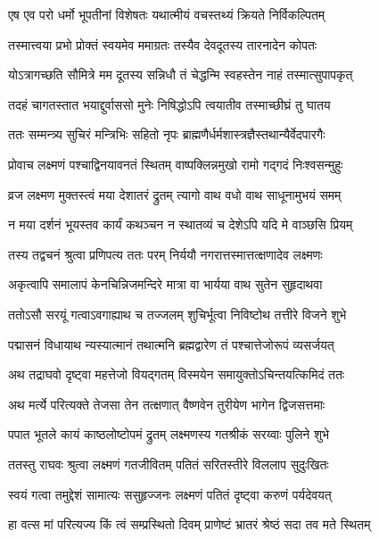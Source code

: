 \twolineshloka
{एष एव परो धर्मो भूपतीनां विशेषतः}
{यथात्मीयं वचस्तथ्यं क्रियते निर्विकल्पितम्}%

\twolineshloka
{तस्मात्त्वया प्रभो प्रोक्तं स्वयमेव ममाग्रतः}
{तस्यैव देवदूतस्य तारनादेन कोपतः}%

\twolineshloka
{योऽत्रागच्छति सौमित्रे मम दूतस्य सन्निधौ}
{तं चेद्धन्मि स्वहस्तेन नाहं तस्मात्सुपापकृत्}%

\twolineshloka
{तदहं चागतस्तात भयाद्दुर्वाससो मुनेः}
{निषिद्धोऽपि त्वयातीव तस्माच्छीघ्रं तु घातय}%

\twolineshloka
{ततः सम्मन्त्र्य सुचिरं मन्त्रिभिः सहितो नृपः}
{ब्राह्मणैर्धर्मशास्त्रज्ञैस्तथान्यैर्वेदपारगैः}%

\twolineshloka
{प्रोवाच लक्ष्मणं पश्चाद्विनयावनतं स्थितम्}
{वाष्पक्लिन्नमुखो रामो गद्गदं निःश्वसन्मुहुः}%

\twolineshloka
{व्रज लक्ष्मण मुक्तस्त्वं मया देशातरं द्रुतम्}
{त्यागो वाथ वधो वाथ साधूनामुभयं समम्}%

\twolineshloka
{न मया दर्शनं भूयस्तव कार्यं कथञ्चन}
{न स्थातव्यं च देशेऽपि यदि मे वाञ्छसि प्रियम्}%

\twolineshloka
{तस्य तद्वचनं श्रुत्वा प्रणिपत्य ततः परम्}
{निर्ययौ नगरात्तस्मात्तत्क्षणादेव लक्ष्मणः}%

\twolineshloka
{अकृत्वापि समालापं केनचिन्निजमन्दिरे}
{मात्रा वा भार्यया वाथ सुतेन सुहृदाथवा}%

\twolineshloka
{ततोऽसौ सरयूं गत्वाऽवगाह्याथ च तज्जलम्}
{शुचिर्भूत्वा निविष्टोथ तत्तीरे विजने शुभे}%

\twolineshloka
{पद्मासनं विधायाथ न्यस्यात्मानं तथात्मनि}
{ब्रह्मद्वारेण तं पश्चात्तेजोरूपं व्यसर्जयत्}%

\twolineshloka
{अथ तद्राघवो दृष्ट्वा महत्तेजो वियद्गतम्}
{विस्मयेन समायुक्तोऽचिन्तयत्किमिदं ततः}%

\twolineshloka
{अथ मर्त्ये परित्यक्ते तेजसा तेन तत्क्षणात्}
{वैष्णवेन तुरीयेण भागेन द्विजसत्तमाः}%

\twolineshloka
{पपात भूतले कायं काष्ठलोष्टोपमं द्रुतम्}
{लक्ष्मणस्य गतश्रीकं सरय्वाः पुलिने शुभे}%

\twolineshloka
{ततस्तु राघवः श्रुत्वा लक्ष्मणं गतजीवितम्}
{पतितं सरितस्तीरे विललाप सुदुःखितः}%

\twolineshloka
{स्वयं गत्वा तमुद्देशं सामात्यः ससुहृज्जनः}
{लक्ष्मणं पतितं दृष्ट्वा करुणं पर्यदेवयत्}%

\twolineshloka
{हा वत्स मां परित्यज्य किं त्वं सम्प्रस्थितो दिवम्}
{प्राणेष्टं भ्रातरं श्रेष्ठं सदा तव मते स्थितम्}%

